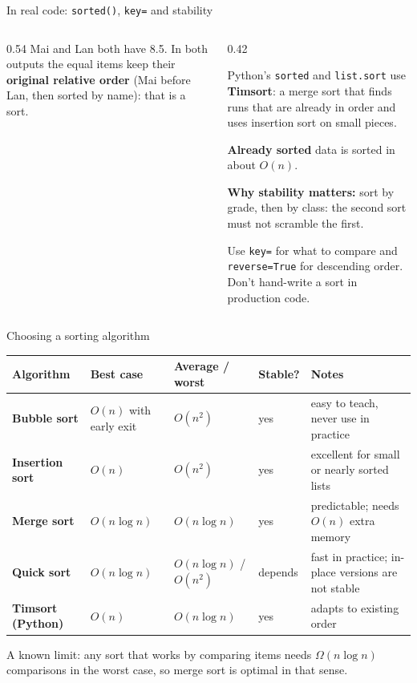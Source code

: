 \documentclass[aspectratio=169,10pt]{beamer}
\begin{document}
\begin{frame}{In real code: \texttt{sorted()}, \texttt{key=} and stability}
\begin{columns}[T]
\begin{column}{0.54\textwidth}
\vspace{2mm}
\vspace{1mm}
{\small Mai and Lan both have 8.5. In both outputs the equal items keep their \textbf{original relative order} (Mai before Lan, then sorted by name): that is a  sort.}
\end{column}
\begin{column}{0.42\textwidth}
{\small
Python's \texttt{sorted} and \texttt{list.sort} use \textbf{Timsort}: a merge sort that finds runs that are already in order and uses insertion sort on small pieces.

\vspace{2mm}
\vspace{2mm}
\textbf{Already sorted} data is sorted in about $O(n)$.

\vspace{2mm}
\textbf{Why stability matters:} sort by grade, then by class: the second sort must not scramble the first.

\vspace{2mm}
Use \texttt{key=} for what to compare and \texttt{reverse=True} for descending order. Don't hand-write a sort in production code.}
\end{column}
\end{columns}
\end{frame}

\begin{frame}{Choosing a sorting algorithm}
\renewcommand{\arraystretch}{1.3}
\footnotesize\setlength\tabcolsep{4pt}
\begin{tabular}{@{}>{\raggedright\bfseries}p{23mm}>{\raggedright}p{26mm}>{\raggedright}p{30mm}>{\centering}p{13mm}>{\raggedright\arraybackslash}p{42mm}@{}}
\toprule
Algorithm & Best case & Average / worst & Stable? & Notes\\
\midrule
Bubble sort & $O(n)$ with early exit & $O(n^2)$ & yes & easy to teach, never use in practice\\
Insertion sort & $O(n)$ & $O(n^2)$ & yes & excellent for small or nearly sorted lists\\
Merge sort & $O(n\log n)$ & $O(n\log n)$ & yes & predictable; needs $O(n)$ extra memory\\
Quick sort & $O(n\log n)$ & $O(n\log n)$ / $O(n^2)$ & depends & fast in practice; in-place versions are not stable\\
Timsort (Python) & $O(n)$ & $O(n\log n)$ & yes & adapts to existing order\\
\bottomrule
\end{tabular}
\vspace{4mm}

{\small A known limit: any sort that works by comparing items needs $\Omega(n\log n)$ comparisons in the worst case, so merge sort is optimal in that sense.}
\end{frame}
\end{document}
